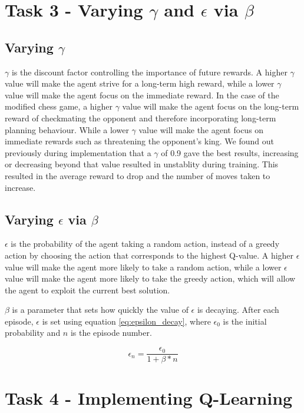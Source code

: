 \documentclass[conference]{IEEEtran}
\begin{document}
\section{Task 3 - Varying $\gamma$ and $\epsilon$ via $\beta$}
\subsection{Varying $\gamma$}
$\gamma$ is the discount factor controlling the importance of future rewards. A higher $\gamma$ value will make the agent strive for a long-term high reward, while a lower $\gamma$ value will make the agent focus on the immediate reward. In the case of the modified chess game, a higher $\gamma$ value will make the agent focus on the long-term reward of checkmating the opponent and therefore incorporating long-term planning behaviour. While a lower $\gamma$ value will make the agent focus on immediate rewards such as threatening the opponent's king. We found out previously during implementation that a $\gamma$ of 0.9 gave the best results, increasing or decreasing beyond that value resulted in unstablity during training. This resulted in the average reward to drop and the number of moves taken to increase.

\subsection{Varying $\epsilon$ via $\beta$}
$\epsilon$ is the probability of the agent taking a random action, instead of a greedy action by choosing the action that corresponds to the highest Q-value. A higher $\epsilon$ value will make the agent more likely to take a random action, while a lower $\epsilon$ value will make the agent more likely to take the greedy action, which will allow the agent to exploit the current best solution.

$\beta$ is a parameter that sets how quickly the value of $\epsilon$ is decaying. After each episode, $\epsilon$ is set using equation \ref{eq:epsilon_decay}, where $\epsilon_0$ is the initial probability and $n$ is the episode number.

\begin{equation}\label{eq:epsilon_decay}
    \epsilon_n = \frac{\epsilon_0}{1 + \beta * n}
\end{equation}

\section{Task 4 - Implementing Q-Learning}
\end{document}
